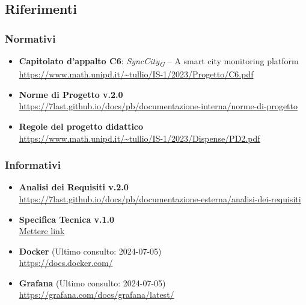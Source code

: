 \subsection{Riferimenti}
    \subsubsection{Normativi}
        \begin{itemize}
            \item \textbf{Capitolato d'appalto C6}: \textit{SyncCity\textsubscript{G} } – A smart city monitoring platform\\
            \url{https://www.math.unipd.it/~tullio/IS-1/2023/Progetto/C6.pdf}
            \item \textbf{Norme di Progetto v.2.0}\\
            \url{https://7last.github.io/docs/pb/documentazione-interna/norme-di-progetto}
            \item \textbf{Regole del progetto didattico}\\
            \url{https://www.math.unipd.it/~tullio/IS-1/2023/Dispense/PD2.pdf}
        \end{itemize}
    \subsubsection{Informativi}
        \begin{itemize}
            \item \textbf{Analisi dei Requisiti v.2.0}\\
            \url{https://7last.github.io/docs/pb/documentazione-esterna/analisi-dei-requisiti}
            \item \textbf{Specifica Tecnica v.1.0}\\
            \url{Mettere link}
            \item \textbf{Docker} (Ultimo consulto: 2024-07-05)\\ \url{https://docs.docker.com/} 
            \item \textbf{Grafana} (Ultimo consulto: 2024-07-05)\\ \url{https://grafana.com/docs/grafana/latest/}
        \end{itemize}
    